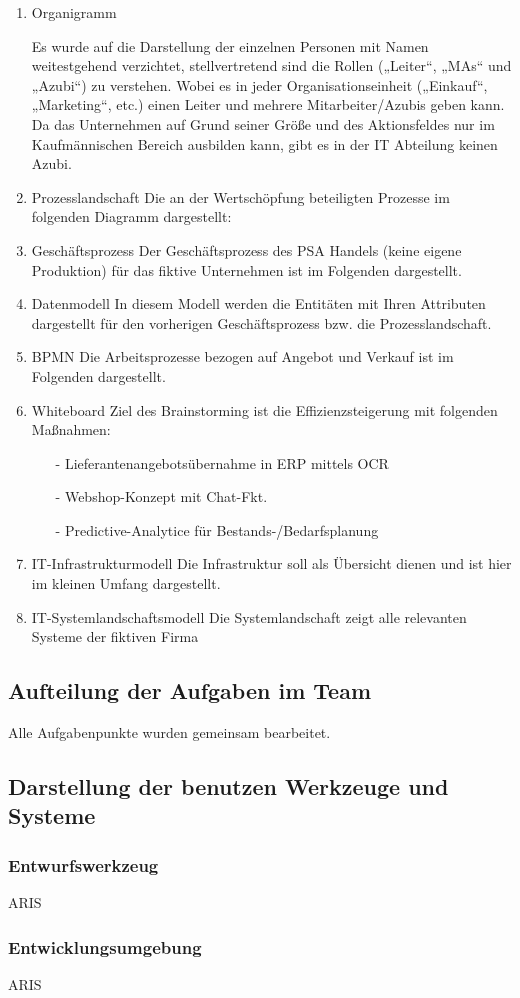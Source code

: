 \begin{enumerate}
\item Organigramm

Es wurde auf die Darstellung der einzelnen Personen mit Namen weitestgehend verzichtet, stellvertretend sind die Rollen („Leiter“, „MAs“ und „Azubi“) zu verstehen. Wobei es in jeder Organisationseinheit („Einkauf“, „Marketing“, etc.) einen Leiter und mehrere Mitarbeiter/Azubis geben kann. Da das Unternehmen auf Grund seiner Größe und des Aktionsfeldes nur im Kaufmännischen Bereich ausbilden kann, gibt es in der IT Abteilung keinen Azubi.

\item Prozesslandschaft
Die an der Wertschöpfung beteiligten Prozesse im folgenden Diagramm dargestellt: 

\item Geschäftsprozess
Der Geschäftsprozess des PSA Handels (keine eigene Produktion) für das fiktive Unternehmen ist im Folgenden dargestellt.

\item Datenmodell
In diesem Modell werden die Entitäten mit Ihren Attributen dargestellt für den vorherigen Geschäftsprozess bzw. die Prozesslandschaft.

\item BPMN
Die Arbeitsprozesse bezogen auf Angebot und Verkauf ist im Folgenden dargestellt. 

\item Whiteboard
Ziel des Brainstorming ist die Effizienzsteigerung mit folgenden Maßnahmen:
\begin{itemize}
	\item[-] Lieferantenangebotsübernahme in ERP mittels OCR
	\item[-] Webshop-Konzept mit Chat-Fkt.
	\item[-] Predictive-Analytice für Bestands-/Bedarfsplanung
\end{itemize}

\item IT-Infrastrukturmodell
Die Infrastruktur soll als Übersicht dienen und ist hier im kleinen Umfang dargestellt.
\item IT-Systemlandschaftsmodell
Die Systemlandschaft zeigt alle relevanten Systeme der fiktiven Firma
\end{enumerate}
\subsection*{Aufteilung der Aufgaben im Team}
Alle Aufgabenpunkte wurden gemeinsam bearbeitet.
\subsection*{Darstellung der benutzen Werkzeuge und Systeme}
\subsubsection*{Entwurfswerkzeug}
ARIS
\subsubsection*{Entwicklungsumgebung}
ARIS
